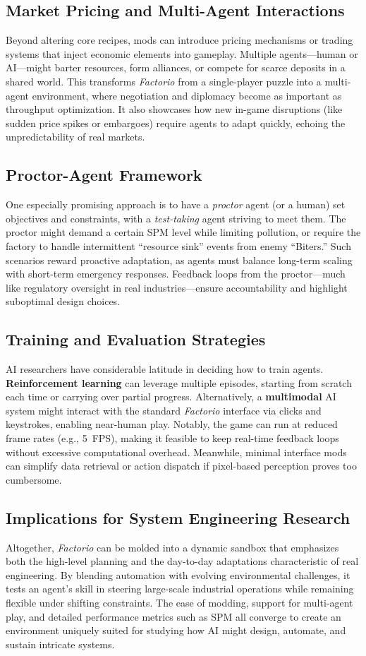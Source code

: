 \subsection{Market Pricing and Multi-Agent Interactions}
Beyond altering core recipes, mods can introduce pricing mechanisms or trading systems that inject economic elements into gameplay. Multiple agents—human or AI—might barter resources, form alliances, or compete for scarce deposits in a shared world. This transforms \textit{Factorio} from a single-player puzzle into a multi-agent environment, where negotiation and diplomacy become as important as throughput optimization. It also showcases how new in-game disruptions (like sudden price spikes or embargoes) require agents to adapt quickly, echoing the unpredictability of real markets.

\subsection{Proctor-Agent Framework}
One especially promising approach is to have a \textit{proctor} agent (or a human) set objectives and constraints, with a \textit{test-taking} agent striving to meet them. The proctor might demand a certain SPM level while limiting pollution, or require the factory to handle intermittent “resource sink” events from enemy “Biters.” Such scenarios reward proactive adaptation, as agents must balance long-term scaling with short-term emergency responses. Feedback loops from the proctor—much like regulatory oversight in real industries—ensure accountability and highlight suboptimal design choices.

\subsection{Training and Evaluation Strategies}
AI researchers have considerable latitude in deciding how to train agents. \textbf{Reinforcement learning} can leverage multiple episodes, starting from scratch each time or carrying over partial progress. Alternatively, a \textbf{multimodal} AI system might interact with the standard \textit{Factorio} interface via clicks and keystrokes, enabling near-human play. Notably, the game can run at reduced frame rates (e.g., 5~FPS), making it feasible to keep real-time feedback loops without excessive computational overhead. Meanwhile, minimal interface mods can simplify data retrieval or action dispatch if pixel-based perception proves too cumbersome.

\subsection{Implications for System Engineering Research}
Altogether, \textit{Factorio} can be molded into a dynamic sandbox that emphasizes both the high-level planning and the day-to-day adaptations characteristic of real engineering. By blending automation with evolving environmental challenges, it tests an agent’s skill in steering large-scale industrial operations while remaining flexible under shifting constraints. The ease of modding, support for multi-agent play, and detailed performance metrics such as SPM all converge to create an environment uniquely suited for studying how AI might design, automate, and sustain intricate systems. 